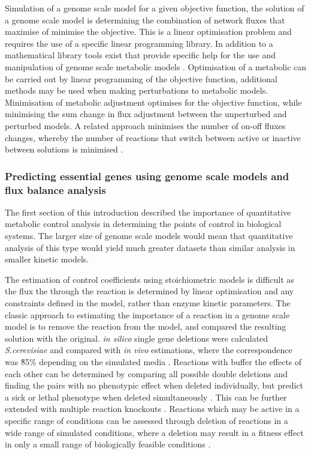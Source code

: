 Simulation of a genome scale model for a given objective function, the solution of a genome scale model is determining the combination of network fluxes that maximise of minimise the objective. This is a linear optimisation problem and requires the use of a specific linear programming library. In addition to a mathematical library tools exist that provide specific help for the use and manipulation of genome scale metabolic models \cite{becker2007}. Optimisation of a metabolic can be carried out by linear programming of the objective function, additional methods may be used when making perturbations to metabolic models. Minimisation of metabolic adjustment \cite{segre2002,burgard2003} optimises for the objective function, while minimising the sum change in flux adjustment between the unperturbed and perturbed models. A related approach minimises the number of on-off fluxes changes, whereby the number of reactions that switch between active or inactive between solutions is minimised \cite{shlomi2005}.


\subsubsection{Predicting essential genes using genome scale models and flux balance analysis}

The first section of this introduction described the importance of quantitative metabolic control analysis in determining the points of control in biological systems. The larger size of genome scale models would mean that quantitative analysis of this type would yield much greater datasets than similar analysis in smaller kinetic models.

The estimation of control coefficients using stoichiometric models is difficult as the flux the through the reaction is determined by linear optimisation and any constraints defined in the model, rather than enzyme kinetic parameters. The classic approach to estimating the importance of a reaction in a genome scale model is to remove the reaction from the model, and compared the resulting solution with the original. \emph{in silico} single gene deletions were calculated \emph{S.cerevisiae} and compared with \emph{in vivo} estimations, where the correspondence was \~85\% depending on the simulated media \cite{famili2003,forster2003}. Reactions with buffer the effects of each other can be determined by comparing all possible double deletions and finding the pairs with no phenotypic effect when deleted individually, but predict a sick or lethal phenotype when deleted simultaneously \cite{harrison2007}. This can be further extended with multiple reaction knockouts \cite{deutscher2008}. Reactions which may be active in a specific range of conditions can be assessed through deletion of reactions in a wide range of simulated conditions, where a deletion may result in a fitness effect in only a small range of biologically feasible conditions \cite{papp2004}.

